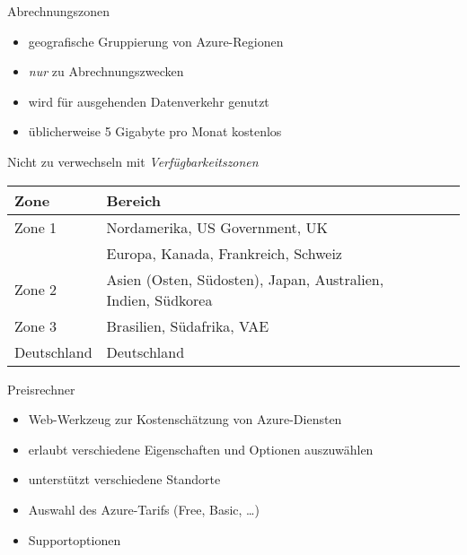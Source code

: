 \begin{flashcard}[Definition]{Abrechnungszonen}
    \begin{itemize}
        \item geografische Gruppierung von Azure-Regionen
        \item \emph{nur} zu Abrechnungszwecken
        \item wird für ausgehenden Datenverkehr genutzt
        \item üblicherweise 5 Gigabyte pro Monat kostenlos
    \end{itemize}
    Nicht zu verwechseln mit \emph{Verfügbarkeitszonen}

    \begin{tabular}{l|lll}
        Zone        &  Bereich\\
        \hline
        Zone 1      &  Nordamerika, US Government, UK\\
                    & Europa, Kanada, Frankreich, Schweiz\\
        Zone 2      &  Asien (Osten, Südosten), Japan, Australien, Indien, Südkorea\\
        Zone 3      &  Brasilien, Südafrika, VAE\\
        Deutschland & Deutschland\\
    \end{tabular}

\end{flashcard}

\begin{flashcard}[Understand]{Preisrechner}
    \begin{itemize}
        \item Web-Werkzeug zur Kostenschätzung von Azure-Diensten
        \item erlaubt verschiedene Eigenschaften und Optionen auszuwählen
        \item unterstützt verschiedene Standorte
        \item Auswahl des Azure-Tarifs (Free, Basic, \ldots)
        \item Supportoptionen
    \end{itemize}

\end{flashcard}

